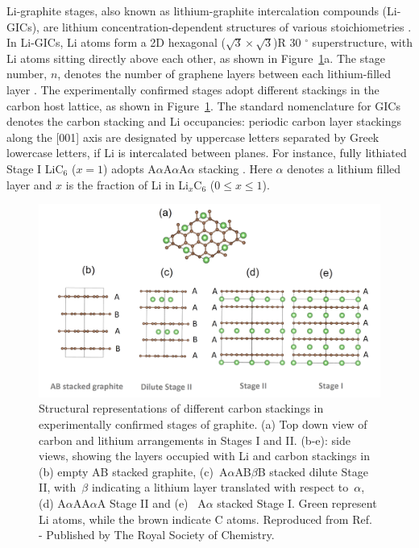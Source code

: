 \documentclass[../main.tex]{subfiles}
\begin{document}
Li-graphite stages, also known as lithium-graphite intercalation compounds (Li-GICs), are lithium concentration-dependent structures of various stoichiometries \cite{Woo1983,GUERARD1975337,Konar2015,Sethuraman2010,Dahn1991}. In Li-GICs, Li atoms form a 2D hexagonal ($\sqrt{3} \times \sqrt{3}$)R 30 $^{\circ}$ superstructure, with Li atoms sitting directly above each other, as shown in Figure~\ref{fig:graphite_stages_schematics}a. The stage number, $n$, denotes the number of graphene layers between each lithium-filled layer \cite{Dahn1991,Ohzuku1993,Konar2015,GUERARD1975337}.
The experimentally confirmed stages adopt different stackings in the carbon host lattice, as shown in Figure~\ref{fig:graphite_stages_schematics}. The standard nomenclature for GICs \cite{Woo1983} denotes the carbon stacking and Li occupancies: periodic carbon layer stackings along the [001] axis are designated by uppercase letters separated by Greek lowercase letters, if Li is intercalated between planes. For instance, fully lithiated Stage I LiC$_{6}$ ($x=1$) adopts A$\alpha$A$\alpha$A$\alpha$ stacking \cite{Konar2015,He_2013,Yazami_2006}. Here $\alpha$ denotes a lithium filled layer and $x$ is the fraction of Li in Li$_{x}$C$_{6}$ ($0 \leq x \leq 1$).

\begin{figure}[h!]
    \begin{center}
    \includegraphics[width=0.98\columnwidth]{figures/stages_version4.png}
    \caption{Structural representations of different carbon stackings in experimentally confirmed stages of graphite. (a) Top down view of carbon and lithium arrangements in Stages I and II. (b-e): side views, showing the layers occupied with Li and carbon stackings in (b) empty AB stacked graphite, (c)~A\(\alpha\)AB\(\beta\)B stacked dilute Stage II, with~\(\beta\) indicating a lithium layer translated with respect to~\(\alpha\), (d)
    A\(\alpha\)AA\(\alpha\)A Stage II and (e)~ A\(\alpha\) stacked Stage I. Green represent Li atoms, while the brown indicate C atoms. Reproduced from Ref.~ - Published by The Royal Society of Chemistry.}
    \label{fig:graphite_stages_schematics}
    \end{center}
\end{figure}
\end{document}
